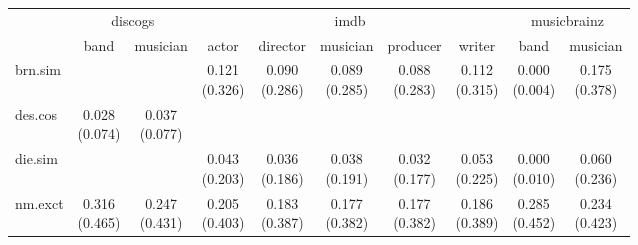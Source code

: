 \documentclass[epsfig,a4paper,11pt,titlepage,twoside,openany]{book}
\begin{document}
\begin{table}[H]
\centering
\begin{tabular}{l|c|c|c|c|c|c|c|c|c|}
\cline{2-10}
                                                           & \multicolumn{2}{c|}{discogs} & \multicolumn{5}{c|}{imdb}                                                & \multicolumn{2}{c|}{musicbrainz} \\ \cline{2-10} 
                                                           & band          & musician     & actor        & director     & musician     & producer     & writer       & band            & musician       \\ \hline
\multicolumn{1}{|l|}{brn.sim}                        &               &              & \makecell{0.121 \\ (0.326)} & \makecell{0.090 \\ (0.286)} & \makecell{0.089 \\ (0.285)} & \makecell{0.088 \\ (0.283)} & \makecell{0.112 \\ (0.315)} & \makecell{0.000 \\ (0.004)}    & \makecell{0.175 \\ (0.378)}   \\ \hline
\multicolumn{1}{|l|}{des.cos}                  & \makecell{0.028 \\ (0.074)}  & \makecell{0.037 \\ (0.077)} &              &              &              &              &              &                 &                \\ \hline
\multicolumn{1}{|l|}{die.sim}                        &               &              & \makecell{0.043 \\ (0.203)} & \makecell{0.036 \\ (0.186)} & \makecell{0.038 \\ (0.191)} & \makecell{0.032 \\ (0.177)} & \makecell{0.053 \\ (0.225)} & \makecell{0.000 \\ (0.010)}    & \makecell{0.060 \\ (0.236)}   \\ \hline
\multicolumn{1}{|l|}{nm.exct}                          & \makecell{0.316 \\ (0.465)}  & \makecell{0.247 \\ (0.431)} & \makecell{0.205 \\ (0.403)} & \makecell{0.183 \\ (0.387)} & \makecell{0.177 \\ (0.382)} & \makecell{0.177 \\ (0.382)} & \makecell{0.186 \\ (0.389)} & \makecell{0.285 \\ (0.452)}    & \makecell{0.234 \\ (0.423)}   \\ \hline

\end{tabular}
\end{table}
\end{document}
